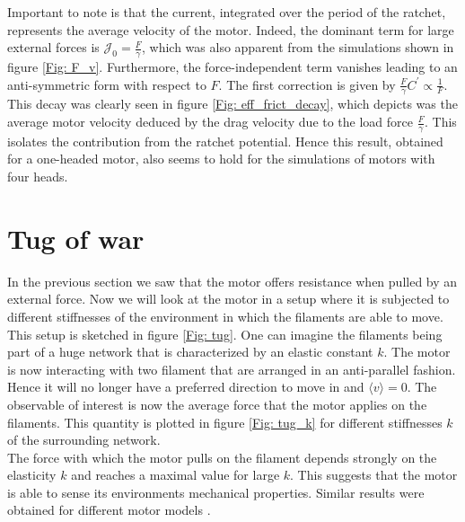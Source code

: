 \documentclass[aps,pre,onecolumn,showpacs,showkeys,a4paper]{revtex4}
\begin{document}
Important to note is that the current, integrated over the period of the ratchet, represents the average velocity of the motor. 
Indeed, the dominant term for large external forces is $\mathcal{J}_0 = \frac{F}{\gamma}$, which was also apparent from the simulations shown in figure \ref{Fig: F_v}. 
Furthermore, the force-independent term vanishes leading to an anti-symmetric form with respect to $F$. 
The first correction is given by $\frac{F}{\gamma}C^\prime\propto \frac{1}{F}$. 
This decay was clearly seen in figure \ref{Fig: eff_frict_decay}, which depicts was the average motor velocity deduced by the drag velocity due to the load force $\frac{F}{\gamma}$. 
This isolates the contribution from the ratchet potential. 
Hence this result, obtained for a one-headed motor, also seems to hold for the simulations of motors with four heads. 



\section{Tug of war}
In the previous section we saw that the motor offers resistance when pulled by an external force. 
Now we will look at the motor in a setup where it is subjected to different stiffnesses of the environment in which the filaments are able to move. 
This setup is sketched in figure \ref{Fig: tug}. 
One can imagine the filaments being part of a huge network that is characterized by an elastic constant $k$. 
The motor is now interacting with two filament that are arranged in an anti-parallel fashion. 
Hence it will no longer have a preferred direction to move in and $\langle v\rangle=0$. 
The observable of interest is now the average force that the motor applies on the filaments. 
This quantity is plotted in figure \ref{Fig: tug_k} for different stiffnesses $k$ of the surrounding network. \\
The force with which the motor pulls on the filament depends strongly on the elasticity $k$ and reaches a maximal value for large $k$. 
This suggests that the motor is able to sense its environments mechanical properties. 
Similar results were obtained for different motor models \cite{stam2015isoforms,albert2014stochastic}.
\end{document}
